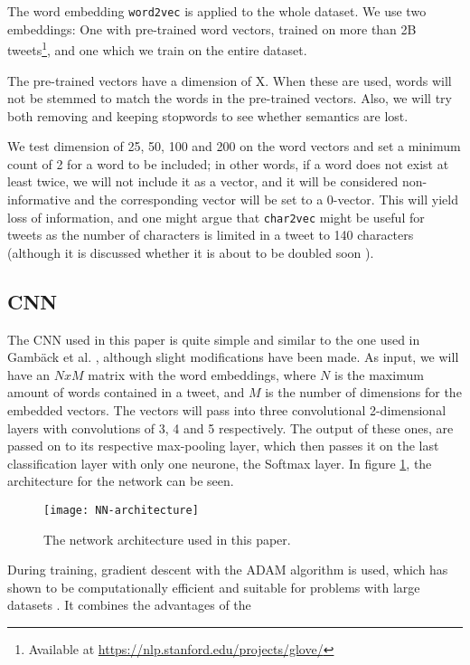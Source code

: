 \documentclass[twocolumn]{article}
\begin{document}
The word embedding \verb|word2vec| is applied to the whole dataset. We use two embeddings: One with pre-trained word vectors, trained on more than 2B tweets\footnote{Available at \url{https://nlp.stanford.edu/projects/glove/}}, and one which we train on the entire dataset. 

The pre-trained vectors have a dimension of X. When these are used, words will not be stemmed to match the words in the pre-trained vectors. Also, we will try both removing and keeping stopwords to see whether semantics are lost. 

We test dimension of 25, 50, 100 and 200 on the word vectors and set a minimum count of 2 for a word to be included; in other words, if a word does not exist at least twice, we will not include it as a vector, and it will be considered non-informative and the corresponding vector will be set to a 0-vector. This will yield loss of information, and one might argue that \verb|char2vec| might be useful for tweets as the number of characters is limited in a tweet to 140 characters (although it is discussed whether it is about to be doubled soon \cite{CNN}). 

\subsection{CNN}

The CNN used in this paper is quite simple and similar to the one used in Gamb\"ack et al. \cite{Gambck2017}, although slight modifications have been made. As input, we will have an $NxM$ matrix with the word embeddings, where $N$ is the maximum amount of words contained in a tweet, and $M$ is the number of dimensions for the embedded vectors. The vectors will pass into three convolutional 2-dimensional layers with convolutions of 3, 4 and 5 respectively. The output of these ones, are passed on to its respective max-pooling layer, which then passes it on the last classification layer with only one neurone, the Softmax layer. In figure \ref{fig:myNN}, the architecture for the network can be seen. 

\begin{figure}
  \texttt{[image: NN-architecture]}
  \caption{The network architecture used in this paper.}
  \label{fig:myNN}
\end{figure} 

During training, gradient descent with the ADAM algorithm is used, which has shown to be computationally efficient and suitable for problems with large datasets \cite{Kingma2014AdamAM}. It combines the advantages of the 
\end{document}
